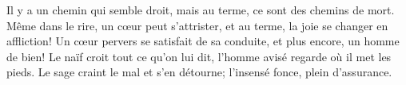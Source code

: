 Il y a un chemin qui semble droit,
	mais au terme, ce sont des chemins de mort.
Même dans le rire, un cœur peut s’attrister,
	et au terme, la joie se changer en affliction!
Un cœur pervers se satisfait de sa conduite,
	et plus encore, un homme de bien!
Le naïf croit tout ce qu’on lui dit,
	l’homme avisé regarde où il met les pieds.
Le sage craint le mal et s’en détourne;
	l’insensé fonce, plein d’assurance.
